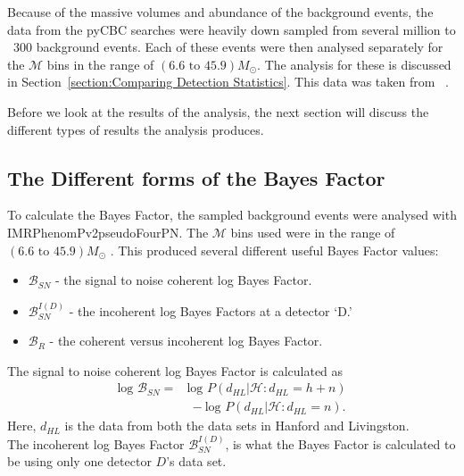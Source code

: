\documentclass{article}
\begin{document}
  
  Because of the massive volumes and abundance of the background events, the data from the pyCBC searches were heavily down sampled from several million to ~300 background events. Each of these events were then analysed separately for the $\mathcal{M}$ bins in the range of $(6.6  \text{ to } 45.9) M_{\odot}$. The analysis for these is discussed in Section~\ref{section:Comparing Detection Statistics}. This data was taken from ~\cite{pyCBCdata}.
  
  Before we look at the results of the analysis, the next section will discuss the different types of results the analysis produces.
  
 
  
  

\subsection{The Different forms of the Bayes Factor}
To calculate the Bayes Factor, the sampled background events were analysed with IMRPhenomPv2pseudoFourPN. The $\mathcal{M}$ bins used were in the range of $(6.6  \text{ to } 45.9) M_{\odot}$ . This produced several different useful Bayes Factor values:

\begin{itemize}
	\item  $\mathcal{B}_{SN}$ - the signal to noise coherent log Bayes Factor.
	\item  $\mathcal{B}_{SN}^{I(D)}$ - the incoherent log Bayes Factors at a detector `D.'
	\item  $\mathcal{B}_{R}$ - the coherent versus incoherent log Bayes Factor.
\end{itemize}

The signal to noise coherent log Bayes Factor is calculated as 
\begin{align} \label{eq:logBayesFactor}
\text{log }\mathcal{B}_{SN} =& \text{log }P(d_{HL} | \mathcal{H} : d_{HL} = h + n)  \nonumber\\ 
&\ - \text{log }P(d_{HL} | \mathcal{H} : d_{HL} =  n) .
\end{align}
Here, $d_{HL}$ is the data from both the data sets in Hanford and Livingston. \\


The incoherent log Bayes Factor $\mathcal{B}_{SN}^{I(D)}$,  is what the Bayes Factor is calculated to be using only one detector $D$'s data set. \\ 
\end{document}
